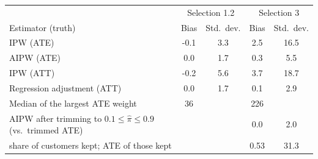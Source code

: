 \begin{tabular}{lcccc}\toprule
& \multicolumn{2}{c}{Selection 1.2} & \multicolumn{2}{c}{Selection 3} \\ Estimator (truth) & Bias & Std.\ dev. & Bias & Std.\ dev. \\ \midrule
IPW (ATE) & -0.1 & 3.3 & 2.5 & 16.5 \\
AIPW (ATE) & 0.0 & 1.7 & 0.3 & 5.5 \\
IPW (ATT) & -0.2 & 5.6 & 3.7 & 18.7 \\
Regression adjustment (ATT) & 0.0 & 1.7 & 0.1 & 2.9 \\
\midrule
Median of the largest ATE weight & 36 & & 226 &  \\
AIPW after trimming to $0.1 \le \hat\pi \le 0.9$ (vs.\ trimmed ATE) & & & 0.0 & 2.0 \\
\quad share of customers kept; ATE of those kept & & & 0.53 & 31.3 \\
\bottomrule\end{tabular}
